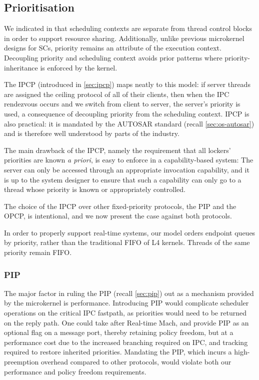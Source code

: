 \subsection{Prioritisation}

We indicated in  that scheduling contexts are separate from thread control blocks in
order to support resource sharing. Additionally, unlike previous microkernel designs for \glspl{SC}, priority
remains an attribute of the execution context. Decoupling priority and scheduling context avoids
prior patterns where priority-inheritance is enforced by the kernel. 

The \Gls{IPCP} (introduced in \cref{sec:ipcp}) maps neatly to this model: if server threads are assigned the ceiling protocol of all of
their clients, then when the \gls{IPC} rendezvous occurs and we switch from client to server, the
server's priority is used, a consequence of decoupling priority from the scheduling context.
\gls{IPCP} is also practical: it is mandated by the AUTOSAR standard
(recall \cref{sec:os-autosar}) and is therefore well understood by parts of the industry.

The main drawback of the \gls{IPCP}, namely the requirement that all
lockers' priorities are known \emph{a priori}, is easy to enforce in a
capability-based system: The server can only be accessed through an
appropriate invocation capability, and it is up to the system designer
to ensure that such a capability can only go to a thread whose
priority is known or appropriately controlled.

The choice of the \gls{IPCP} over other fixed-priority protocols, the \gls{PIP} and the \gls{OPCP},
is intentional, and we now present the case against both protocols.

In order to properly support real-time systems, our model orders endpoint queues by priority, rather
than the traditional \gls{FIFO} of L4 kernels. Threads of the same priority remain FIFO. 

\subsubsection{\gls{PIP}}

The major factor in ruling the \gls{PIP} (recall \cref{sec:pip}) out as a mechanism provided by the microkernel is
performance. Introducing \gls{PIP} would complicate scheduler operations on the critical
\gls{IPC} fastpath, as priorities would need to be returned on the reply path. One could take after
Real-time Mach, and provide \gls{PIP} as an optional flag on a message port, thereby retaining
policy freedom, but at a performance cost due to the increased branching required on \gls{IPC}, and
tracking required to restore inherited priorities. Mandating the \gls{PIP}, which incurs a high-preemption
overhead compared to other protocols, would violate both our performance and policy freedom
requirements. 

